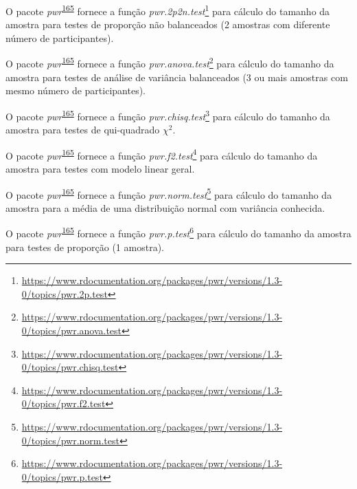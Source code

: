 \documentclass[
  a4paper,
]{book}
\renewcommand{\href}[2]{#2\footnote{\url{#1}}}
\newenvironment{infobox}[1]
  {
  \begin{itemize}
  \renewcommand{\labelitemi}{
    \raisebox{-.7\height}[0pt][0pt]{
      {\setkeys{Gin}{width=3em,keepaspectratio}
        \texttt{[image: \#1]}}
    }
  }
  \setlength{\fboxsep}{1em}
  \begin{blackbox}
  \item
  }
  {
  \end{blackbox}
  \end{itemize}
  }
\begin{document}
\begin{infobox}{images/Rlogo}
O pacote \emph{pwr}\textsuperscript{\protect\hyperlink{ref-pwr}{165}} fornece a função \href{https://www.rdocumentation.org/packages/pwr/versions/1.3-0/topics/pwr.2p.test}{\emph{pwr.2p2n.test}} para cálculo do tamanho da amostra para testes de proporção não balanceados (2 amostras com diferente número de participantes).

\end{infobox}

\begin{infobox}{images/Rlogo}
O pacote \emph{pwr}\textsuperscript{\protect\hyperlink{ref-pwr}{165}} fornece a função \href{https://www.rdocumentation.org/packages/pwr/versions/1.3-0/topics/pwr.anova.test}{\emph{pwr.anova.test}} para cálculo do tamanho da amostra para testes de análise de variância balanceados (3 ou mais amostras com mesmo número de participantes).

\end{infobox}

\begin{infobox}{images/Rlogo}
O pacote \emph{pwr}\textsuperscript{\protect\hyperlink{ref-pwr}{165}} fornece a função \href{https://www.rdocumentation.org/packages/pwr/versions/1.3-0/topics/pwr.chisq.test}{\emph{pwr.chisq.test}} para cálculo do tamanho da amostra para testes de qui-quadrado \(\chi^2\).

\end{infobox}

\begin{infobox}{images/Rlogo}
O pacote \emph{pwr}\textsuperscript{\protect\hyperlink{ref-pwr}{165}} fornece a função \href{https://www.rdocumentation.org/packages/pwr/versions/1.3-0/topics/pwr.f2.test}{\emph{pwr.f2.test}} para cálculo do tamanho da amostra para testes com modelo linear geral.

\end{infobox}

\begin{infobox}{images/Rlogo}
O pacote \emph{pwr}\textsuperscript{\protect\hyperlink{ref-pwr}{165}} fornece a função \href{https://www.rdocumentation.org/packages/pwr/versions/1.3-0/topics/pwr.norm.test}{\emph{pwr.norm.test}} para cálculo do tamanho da amostra para a média de uma distribuição normal com variância conhecida.

\end{infobox}

\begin{infobox}{images/Rlogo}
O pacote \emph{pwr}\textsuperscript{\protect\hyperlink{ref-pwr}{165}} fornece a função \href{https://www.rdocumentation.org/packages/pwr/versions/1.3-0/topics/pwr.p.test}{\emph{pwr.p.test}} para cálculo do tamanho da amostra para testes de proporção (1 amostra).

\end{infobox}
\end{document}
